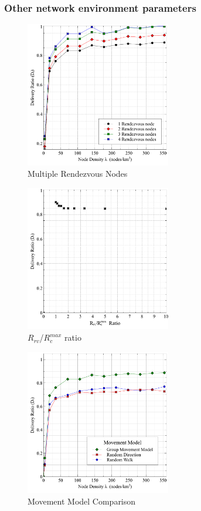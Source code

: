 \documentclass[conference]{IEEEtran}
\begin{document}

\subsubsection{Other network environment parameters}

\begin{figure}[!t]
	\centering
	\includegraphics[width=2.5in]{Graphs/MultipleRVs.pdf}
	\caption{Multiple Rendezvous Nodes}
	\label{Multiple Rendezvous Nodes}
\end{figure}

\begin{figure}[!t]
\centering
\includegraphics[width=2.5in]{Graphs/RcmaxRrv.pdf}
\caption{$R_{rv}$/$R_c^{max}$ ratio}
\label{RrvRcmaxRatio}
\end{figure}

\begin{figure}[!t]
\centering
\includegraphics[width=2.5in]{Graphs/movement.pdf}
\caption{Movement Model Comparison}
\label{Movement Model Comparison}
\end{figure}
\end{document}
